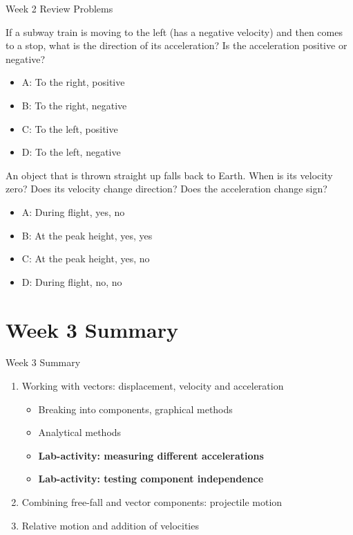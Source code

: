 \documentclass{beamer}
\begin{document}
\begin{frame}{Week 2 Review Problems}
\small
\begin{minipage}[b]{0.45\linewidth}
If a subway train is moving to the left (has a negative velocity) and then comes to a stop, what is the direction of its acceleration? Is the acceleration positive or negative?
\begin{itemize}
\vspace{0.5cm}
\item A: To the right, positive
\item B: To the right, negative
\item C: To the left, positive
\item D: To the left, negative
\end{itemize}
\end{minipage}
\hspace{0.5cm}
\begin{minipage}[b]{0.45\linewidth}
An object that is thrown straight up falls back to Earth.  When is its velocity zero?  Does its velocity change direction?  Does the acceleration change sign?
\begin{itemize}
\item A: During flight, yes, no
\item B: At the peak height, yes, yes
\item C: At the peak height, yes, no
\item D: During flight, no, no
\end{itemize}
\end{minipage}
\end{frame}

\section{Week 3 Summary}

\begin{frame}{Week 3 Summary}
\begin{enumerate}
\item Working with vectors: displacement, velocity and acceleration
\begin{itemize}
\item Breaking into components, graphical methods
\item Analytical methods
\item \textbf{Lab-activity: measuring different accelerations}
\item \textbf{Lab-activity: testing component independence}
\end{itemize}
\item Combining free-fall and vector components: \alert{projectile motion}
\item Relative motion and addition of velocities
\end{enumerate}
\end{frame}
\end{document}
